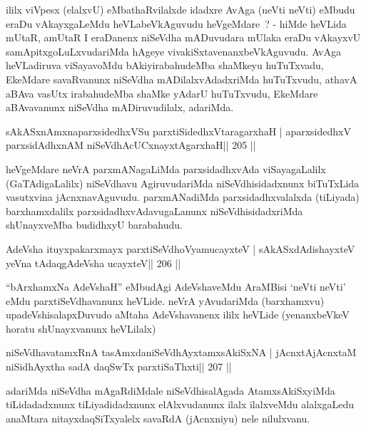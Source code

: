 \begin{artha}
ililx viVpesx (elalxvU) eMbathaRvilalxde idadxre AvAga (neVti neVti)
eMbudu eraDu vAkayxgaLeMdu heVLabeVkAguvudu heVgeMdare~? - hiMde
heVLida mUtaR, amUtaR I eraDanenx niSeVdha mADuvudara mUlaka eraDu
vAkayxvU samApitxgoLuLxvudariMda hAgeye
vivakiSxtavenanxbeVkAguvudu. AvAga heVLadiruva viSayavoMdu
bAkiyirabahudeMba shaMkeyu huTuTxvadu, EkeMdare savaRvanunx niSeVdha
mADilalxvAdadxriMda huTuTxvudu, athavA aBAva vasUtx irabahudeMba
shaMke yAdarU huTuTxvudu, EkeMdare aBAvavanunx
niSeVdha mADiruvudilalx, adariMda.
\end{artha}

\begin{shl}
sAkASxnAmxnaparxsidedhxVSu parxtiSidedhxVtaragarxhaH |
aparxsidedhxV parxsidAdhxnAM niSeVdhAcUCxnayxtAgarxhaH\hfill || 205 ||
\end{shl}

\begin{artha}
heVgeMdare neVrA parxmANagaLiMda parxsidadhxvAda viSayagaLalilx
(GaTAdigaLalilx) niSeVdhavu AgiruvudariMda niSeVdhisidadxnunx
biTuTxLida vasutxvina jAcnxnavAguvudu. parxmANadiMda
parxsidadhxvalalxda (tiLiyada) barxhamxdalilx
parxsidadhxvAdavugaLanunx niSeVdhisidadxriMda shUnayxveMba budidhxyU
barabahudu.
\end{artha}


\begin{shl}
AdeVsha ituyxpakarxmayx parxtiSeVdhoV\s yamucayxteV |
sAkASxdAdishayxteV yeVna tAdaqgAdeVsha ucayxteV\hfill || 206 ||
\end{shl}

\begin{artha}
``bArxhamxNa AdeVshaH'' eMbudAgi AdeVshaveMdu AraMBisi `neVti neVti'
  eMdu parxtiSeVdhavanunx heVLide. neVrA yAvudariMda (barxhamxvu)
  upadeVshisalapxDuvudo aMtaha AdeVshavanenx ililx heVLide (yenanxbeVkeV horatu shUnayxvanunx heVLilalx)
\end{artha}

\begin{shl}
niSeVdhavatamxRnA tasAmxdaniSeVdhAyxtamxsAkiSxNA |
jAcnxtAjAcnxtaM niSidhAyxtha sadA daqSwTx parxtiSaThxti\hfill || 207 ||
\end{shl}

\begin{artha}
adariMda niSeVdha mAgaRdiMdale niSeVdhisalAgada AtamxsAkiSxyiMda tiLidadadxnunx tiLiyadidadxnunx elAlxvudanunx ilalx ilalxveMdu alalxgaLedu anaMtara nitayxdaqSiTxyalelx savaRdA (jAcnxniyu) nele nilulxvanu.
\end{artha}

